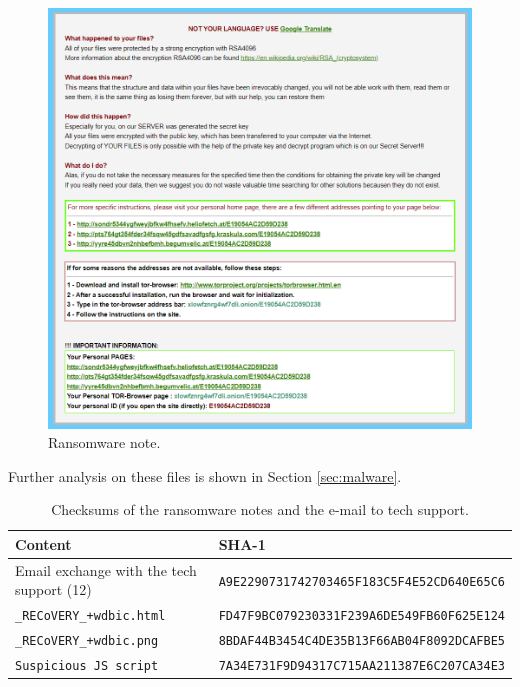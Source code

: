 \documentclass[12pt]{article}
\begin{document}
\begin{figure}[!ht]
    \centering
    \includegraphics[width=\textwidth]{images/recovery_file.png}
    \caption{Ransomware note.}
    \label{fig:rec-file}
\end{figure}
Further analysis on these files is shown in Section \ref{sec:malware}.

\begin{table}[!ht]
    \centering
    \begin{tabular}{ll}
    \toprule
    \textbf{Content} & \textbf{SHA-1} \\
    \midrule
    Email exchange with the tech support (12) & \texttt{A9E2290731742703465F183C5F4E52CD640E65C6} \\
    \texttt{\_RECoVERY\_+wdbic.html} & \texttt{FD47F9BC079230331F239A6DE549FB60F625E124} \\
    \texttt{\_RECoVERY\_+wdbic.png} & \texttt{8BDAF44B3454C4DE35B13F66AB04F8092DCAFBE5} \\
    \texttt{Suspicious JS script} & \texttt{7A34E731F9D94317C715AA211387E6C207CA34E3} \\
    \bottomrule
    \end{tabular}
    \caption{Checksums of the ransomware notes and the e-mail to tech support.}
    \label{table:sha1-malware-info}
\end{table}
\end{document}
